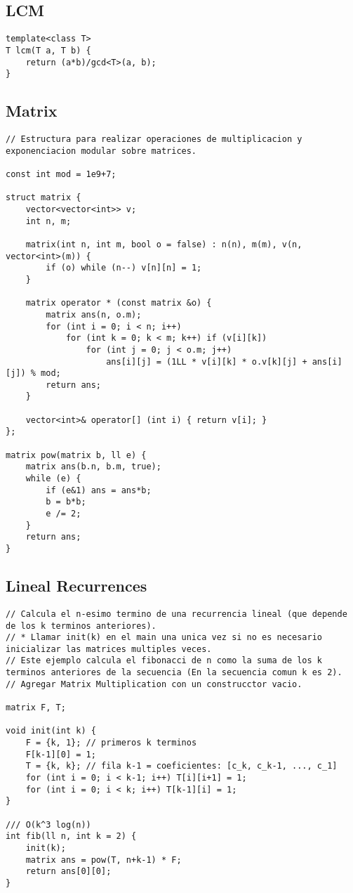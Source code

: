 \documentclass[10pt,letterpaper,twocolumn,twosided]{article}
\begin{document}
\subsection{LCM}
\begin{lstlisting}
template<class T>
T lcm(T a, T b) {  
    return (a*b)/gcd<T>(a, b);  
}
\end{lstlisting}

\subsection{Matrix}
\begin{lstlisting}
// Estructura para realizar operaciones de multiplicacion y exponenciacion modular sobre matrices.

const int mod = 1e9+7;

struct matrix {
    vector<vector<int>> v;
    int n, m;
    
    matrix(int n, int m, bool o = false) : n(n), m(m), v(n, vector<int>(m)) {
        if (o) while (n--) v[n][n] = 1;
    }

    matrix operator * (const matrix &o) {
        matrix ans(n, o.m);
        for (int i = 0; i < n; i++)
            for (int k = 0; k < m; k++) if (v[i][k])
                for (int j = 0; j < o.m; j++)
                    ans[i][j] = (1LL * v[i][k] * o.v[k][j] + ans[i][j]) % mod;
        return ans;
    }
    
    vector<int>& operator[] (int i) { return v[i]; }
};

matrix pow(matrix b, ll e) {
    matrix ans(b.n, b.m, true);
    while (e) {
        if (e&1) ans = ans*b;
        b = b*b;
        e /= 2;
    }
    return ans;
}
\end{lstlisting}

\subsection{Lineal Recurrences}
\begin{lstlisting}
// Calcula el n-esimo termino de una recurrencia lineal (que depende de los k terminos anteriores).
// * Llamar init(k) en el main una unica vez si no es necesario inicializar las matrices multiples veces.
// Este ejemplo calcula el fibonacci de n como la suma de los k terminos anteriores de la secuencia (En la secuencia comun k es 2).
// Agregar Matrix Multiplication con un construcctor vacio.

matrix F, T;

void init(int k) {
    F = {k, 1}; // primeros k terminos
    F[k-1][0] = 1;
    T = {k, k}; // fila k-1 = coeficientes: [c_k, c_k-1, ..., c_1]
    for (int i = 0; i < k-1; i++) T[i][i+1] = 1;
    for (int i = 0; i < k; i++) T[k-1][i] = 1;
}

/// O(k^3 log(n))
int fib(ll n, int k = 2) {
    init(k);
    matrix ans = pow(T, n+k-1) * F;
    return ans[0][0];
}
\end{lstlisting}
\end{document}
